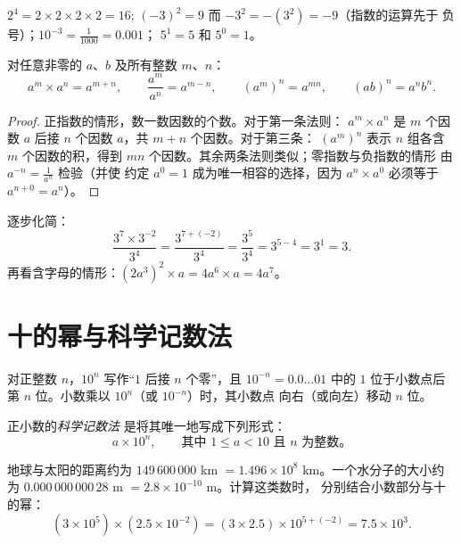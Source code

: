 \begin{example}
$2^4 = 2 \times 2 \times 2 \times 2 = 16$; \quad
$(-3)^2 = 9$ 而 $-3^2 = -(3^2) = -9$（指数的运算先于
负号）；\quad $10^{-3} = \frac{1}{1000} = 0.001$； \quad
$5^1 = 5$ 和 $5^0 = 1$。
\end{example}

\begin{theorem}[指数运算法则]\label{thm:g9:fractions:rules}
对任意非零的 $a$、$b$ 及所有整数 $m$、$n$：
\[
a^m \times a^n = a^{m+n},
\qquad
\frac{a^m}{a^n} = a^{m-n},
\qquad
\left(a^m\right)^n = a^{mn},
\qquad
(ab)^n = a^n b^n .
\]
\end{theorem}

\begin{proof}
正指数的情形，数一数因数的个数。对于第一条法则：
$a^m \times a^n$ 是 $m$ 个因数 $a$ 后接 $n$ 个因数 $a$，共
$m + n$ 个因数。对于第三条：
$\left(a^m\right)^n$ 表示 $n$ 组各含 $m$ 个因数的积，得到
$mn$ 个因数。其余两条法则类似；零指数与负指数的情形
由 $a^{-n} = \frac{1}{a^n}$ 检验（并使
约定 $a^0 = 1$ 成为唯一相容的选择，因为
$a^n \times a^0$ 必须等于 $a^{n+0} = a^n$）。
\end{proof}

\begin{example}\label{ex:g9:fractions:rules}
逐步化简：
\[
\frac{3^7 \times 3^{-2}}{3^4}
= \frac{3^{7 + (-2)}}{3^4}
= \frac{3^5}{3^4}
= 3^{5-4} = 3^1 = 3 .
\]
再看含字母的情形：$(2a^3)^2 \times a = 4 a^6 \times a = 4a^7$。
\end{example}

\section{十的幂与科学记数法}

\begin{proposition}[十的幂]\label{prop:g9:fractions:ten}
对正整数 $n$，$10^n$ 写作“$1$ 后接 $n$
个零”，且 $10^{-n} = 0.0\dots01$ 中的 $1$ 位于小数点后第 $n$
位。小数乘以 $10^n$（或 $10^{-n}$）时，其小数点
向右（或向左）移动 $n$ 位。
\end{proposition}

\begin{definition}[科学记数法]\label{def:g9:fractions:scientific}
正小数的\emph{科学记数法}
是将其唯一地写成下列形式：
\[
a \times 10^n,
\qquad\text{其中 } 1 \leq a < 10 \text{ 且 } n \text{ 为整数。}
\]
\end{definition}

\begin{example}\label{ex:g9:fractions:scientific}
地球与太阳的距离约为 $149\,600\,000$ km $= 1.496 \times
10^8$ km。一个水分子的大小约为 $0.000\,000\,000\,28$ m
$= 2.8 \times 10^{-10}$ m。计算这类数时，
分别结合小数部分与十的幂：
\[
(3 \times 10^5) \times (2.5 \times 10^{-2})
= (3 \times 2.5) \times 10^{5 + (-2)}
= 7.5 \times 10^{3}.
\]
\end{example}

